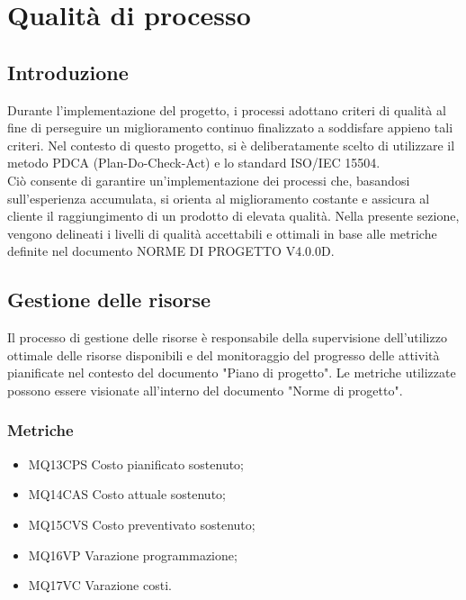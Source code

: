 \section{Qualità di processo}
\subsection{Introduzione}
Durante l'implementazione del progetto, i processi adottano criteri di qualità al fine di perseguire un miglioramento continuo finalizzato a soddisfare appieno tali criteri.
 Nel contesto di questo progetto, si è deliberatamente scelto di utilizzare il metodo PDCA (Plan-Do-Check-Act) e lo standard ISO/IEC 15504.
\\
Ciò consente di garantire un'implementazione dei processi che, basandosi sull'esperienza accumulata, si orienta al miglioramento costante e assicura al cliente il raggiungimento di un prodotto di elevata qualità. Nella presente sezione, vengono delineati i livelli di qualità accettabili e ottimali in base alle metriche definite nel documento NORME DI PROGETTO V4.0.0D.

\subsection{Gestione delle risorse}
Il processo di gestione delle risorse è responsabile della supervisione dell'utilizzo ottimale delle risorse disponibili e del monitoraggio del progresso delle attività pianificate nel contesto del documento "Piano di progetto".
Le metriche utilizzate possono essere visionate all’interno del documento "Norme di progetto".
\subsubsection*{Metriche}
\begin{itemize}
    \item MQ13CPS Costo pianificato sostenuto;
    \item MQ14CAS Costo attuale sostenuto;
    \item MQ15CVS Costo preventivato sostenuto;
    \item MQ16VP Varazione programmazione;
    \item MQ17VC Varazione costi.
\end{itemize}
